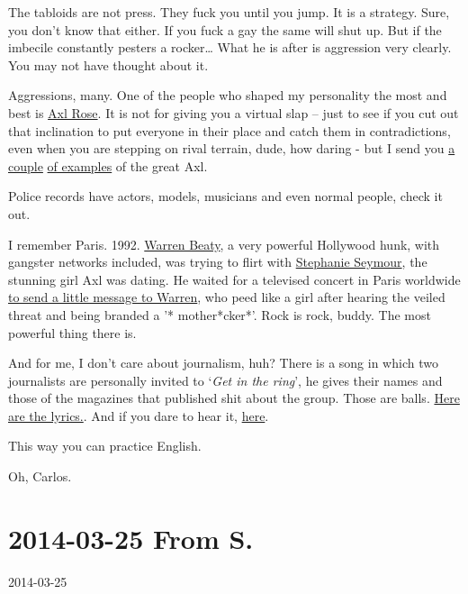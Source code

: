 \documentclass[]{book}
\begin{document}
The tabloids are not press. They fuck you until you jump. It is a strategy. Sure, you don't know that either. If you fuck a gay the same will shut up. But if the imbecile constantly pesters a rocker\ldots{} What he is after is aggression very clearly. You may not have thought about it.

Aggressions, many. One of the people who shaped my personality the most and best is \href{https://en.wikipedia.org/wiki/Axl_Rose}{Axl Rose}. It is not for giving you a virtual slap -- just to see if you cut out that inclination to put everyone in their place and catch them in contradictions, even when you are stepping on rival terrain, dude, how daring - but I send you \href{https://www.youtube.com/watch?v=rrTiSxCWkNs}{a couple} \href{https://www.youtube.com/watch?v=idvQQqbqk0E}{of examples} of the great Axl.

Police records have actors, models, musicians and even normal people, check it out.

I remember Paris. 1992. \href{https://en.wikipedia.org/wiki/Warren_Beatty}{Warren Beaty}, a very powerful Hollywood hunk, with gangster networks included, was trying to flirt with \href{https://en.wikipedia.org/wiki/Stephanie_Seymour}{Stephanie Seymour}, the stunning girl Axl was dating. He waited for a televised concert in Paris worldwide \href{https://www.youtube.com/watch?v=KR6KI0h1gbU}{to send a little message to Warren}, who peed like a girl after hearing the veiled threat and being branded a '* mother*cker*'. Rock is rock, buddy. The most powerful thing there is.

And for me, I don't care about journalism, huh? There is a song in which two journalists are personally invited to `\emph{Get in the ring}', he gives their names and those of the magazines that published shit about the group. Those are balls. \href{https://www.songstraducidas.com/letratraducida-Get_in_the_ring_4254.htm}{Here are the lyrics.}. And if you dare to hear it, \href{https://www.youtube.com/watch?v=8WnTWt_LsgM}{here}.

This way you can practice English.

Oh, Carlos.

\hypertarget{toS20140325}{%
\section*{2014-03-25 From S.}\label{toS20140325}}

2014-03-25
\end{document}
